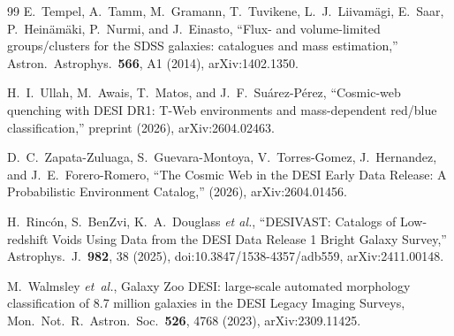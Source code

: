 \documentclass[aps,prd,twocolumn,superscriptaddress,showpacs,preprintnumbers,nofootinbib,longbibliography,floatfix]{revtex4-2}
\begin{document}
\begin{thebibliography}{99}
E.~Tempel, A.~Tamm, M.~Gramann, T.~Tuvikene, L.~J.~Liivam\"agi,
E.~Saar, P.~Hein\"am\"aki, P.~Nurmi, and J.~Einasto,
``Flux- and volume-limited groups/clusters for the SDSS galaxies:
catalogues and mass estimation,'' Astron.\ Astrophys.\ \textbf{566},
A1 (2014), arXiv:1402.1350.

H.~I.~Ullah, M.~Awais, T.~Matos, and J.~F.~Su\'arez-P\'erez,
``Cosmic-web quenching with DESI DR1: T-Web environments and
mass-dependent red/blue classification,''
preprint (2026), arXiv:2604.02463.

D.~C.~Zapata-Zuluaga, S.~Guevara-Montoya, V.~Torres-Gomez,
J.~Hernandez, and J.~E.~Forero-Romero, ``The Cosmic Web in the DESI
Early Data Release: A Probabilistic Environment Catalog,'' (2026),
arXiv:2604.01456.

H.~Rinc\'on, S.~BenZvi, K.~A.~Douglass \textit{et al.},
``DESIVAST: Catalogs of Low-redshift Voids Using Data from the DESI
Data Release 1 Bright Galaxy Survey,'' Astrophys.\ J.\ \textbf{982},
38 (2025), doi:10.3847/1538-4357/adb559, arXiv:2411.00148.

M.~Walmsley \emph{et~al.}, Galaxy Zoo DESI: large-scale automated
morphology classification of 8.7 million galaxies in the DESI Legacy
Imaging Surveys, Mon.\ Not.\ R.\ Astron.\ Soc.\ \textbf{526}, 4768 (2023),
arXiv:2309.11425.

\end{thebibliography}
\end{document}
